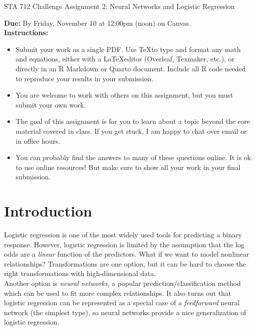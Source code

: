 \documentclass[11pt]{article}
\begin{document}
\begin{center}
\Large
STA 712 Challenge Assignment 2: Neural Networks and Logistic Regression\\
\normalsize
\vspace{5mm}
\end{center}

\noindent \textbf{Due:} By Friday, November 10 at 12:00pm (noon) on Canvas.\\

\noindent \textbf{Instructions:} 
\begin{itemize}
\item Submit your work as a single PDF. Use \TeX to type and format any math and equations, either with a \LaTeX editor (Overleaf, Texmaker, etc.), or directly in an R Markdown or Quarto document. Include all R code needed to reproduce your results in your submission.
\item You are welcome to work with others on this assignment, but you must submit your own work.
\item The goal of this assignment is for you to learn about a topic beyond the core material covered in class. If you get stuck, I am happy to chat over email or in office hours.
\item You can probably find the answers to many of these questions online. It is ok to use online resources! But make sure to show all your work in your final submission.
\end{itemize}

\section*{Introduction}

Logistic regression is one of the most widely used tools for predicting a binary response. However, logistic regression is limited by the assumption that the log odds are a \textit{linear} function of the predictors. What if we want to model nonlinear relationships? Transformations are one option, but it can be hard to choose the right transformations with high-dimensional data.\\

\noindent Another option is \textit{neural networks}, a popular prediction/classification method which can be used to fit more complex relationships. It also turns out that logistic regression can be represented as a special case of a \textit{feedforward} neural network (the simplest type), so neural networks provide a nice generalization of logistic regression.\\
\end{document}
